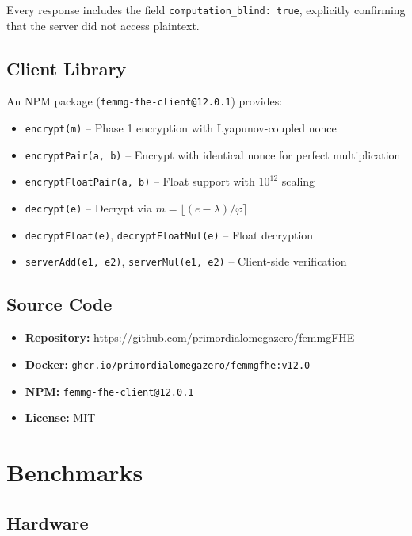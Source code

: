 \documentclass{article}
\begin{document}
Every response includes the field \texttt{computation\_blind: true}, explicitly confirming that the server did not access plaintext.

\subsection{Client Library}

An NPM package (\texttt{femmg-fhe-client@12.0.1}) provides:
\begin{itemize}
    \item \texttt{encrypt(m)} -- Phase 1 encryption with Lyapunov-coupled nonce
    \item \texttt{encryptPair(a, b)} -- Encrypt with identical nonce for perfect multiplication
    \item \texttt{encryptFloatPair(a, b)} -- Float support with $10^{12}$ scaling
    \item \texttt{decrypt(e)} -- Decrypt via $m = \lfloor (e-\lambda)/\varphi \rceil$
    \item \texttt{decryptFloat(e)}, \texttt{decryptFloatMul(e)} -- Float decryption
    \item \texttt{serverAdd(e1, e2)}, \texttt{serverMul(e1, e2)} -- Client-side verification
\end{itemize}

\subsection{Source Code}

\begin{itemize}
    \item \textbf{Repository:} \url{https://github.com/primordialomegazero/femmgFHE}
    \item \textbf{Docker:} \texttt{ghcr.io/primordialomegazero/femmgfhe:v12.0}
    \item \textbf{NPM:} \texttt{femmg-fhe-client@12.0.1}
    \item \textbf{License:} MIT
\end{itemize}

\section{Benchmarks}

\subsection{Hardware}
\end{document}

